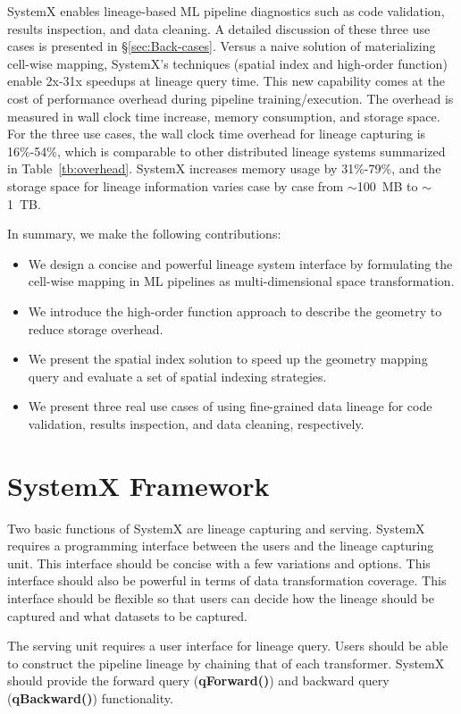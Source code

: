 \documentclass{sig-alternate}
\newenvironment{shortlist}{
        \vspace*{-0.5em}
  \begin{itemize}
  \setlength{\itemsep}{-0.1em}
}{
  \end{itemize}
        \vspace*{-0.5em}
}
\begin{document}
SystemX enables lineage-based ML pipeline diagnostics such as code validation, results inspection, and data cleaning.
A detailed discussion of these three use cases is presented in \S\ref{sec:Back-cases}.
Versus a naive solution of materializing cell-wise mapping, 
SystemX's techniques (spatial index and high-order function) enable 2x-31x speedups at lineage query time.
This new capability comes at the cost of performance overhead during pipeline training/execution.
The overhead is measured in wall clock time increase, memory consumption, and storage space.
For the three use cases, the wall clock time overhead for lineage capturing is 16\%-54\%, which is comparable to other distributed lineage systems
summarized in Table~\ref{tb:overhead}.
SystemX increases memory usage by 31\%-79\%,
and the storage space for lineage information varies case by case from $\sim$100~MB to $\sim$1~TB.


In summary, we make the following contributions:
\begin{shortlist}
\item{} We design a concise and powerful lineage system interface by formulating the cell-wise mapping in ML pipelines as multi-dimensional space transformation.
\item{} We introduce the high-order function approach to describe the geometry to reduce storage overhead.
\item{} We present the spatial index solution to speed up the geometry mapping query and evaluate a set of spatial indexing strategies.
\item{} We present three real use cases of using fine-grained data lineage for code validation, results inspection, and data cleaning, respectively.
\end{shortlist}

\section{S\MakeLowercase{ystem}X Framework}
\label{sec:functional}
Two basic functions of SystemX are lineage capturing and serving.
SystemX requires a programming interface between the users and the lineage capturing unit. 
This interface should be concise with a few variations and options.
This interface should also be powerful in terms of data transformation coverage.
This interface should be flexible so that users can decide how the lineage should be captured and what datasets to be captured.

The serving unit requires a user interface for lineage query.
Users should be able to construct the pipeline lineage by chaining that of each transformer.
SystemX should provide the forward query ({\bf qForward()}) and backward query ({\bf qBackward()}) functionality.
\end{document}
